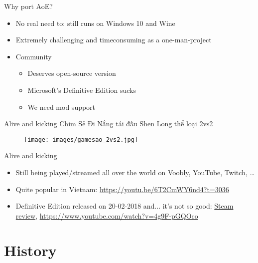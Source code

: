\documentclass{beamer}
\begin{document}

\begin{frame}{Why port AoE?}
	\begin{itemize}
		\item No real need to: still runs on Windows 10 and Wine
		\item Extremely challenging and timeconsuming as a one-man-project
		\item Community
		\begin{itemize}
			\item Deserves open-source version
			\item Microsoft's Definitive Edition sucks
			\item We need mod support
		\end{itemize}
	\end{itemize}
\end{frame}


\begin{frame}{Alive and kicking}
	Chim Sẻ Đi Nắng tái đấu Shen Long thể loại 2vs2

	\begin{figure}
	\texttt{[image: images/gamesao\_2vs2.jpg]}
	\end{figure}

\end{frame}


\begin{frame}{Alive and kicking}
	\begin{itemize}
		\item Still being played/streamed all over the world on Voobly, YouTube, Twitch, \dots
		\item Quite popular in Vietnam: \url{https://youtu.be/6T2CmWY6nd4?t=3036}
		\item Definitive Edition released on 20-02-2018 and... it's not so good:
		\href{https://steamcommunity.com/id/youshallnothash/recommended/1017900/}{Steam review},
		\url{https://www.youtube.com/watch?v=4g9F-pGQOco}
	\end{itemize}

\end{frame}


\section{History}
\end{document}
